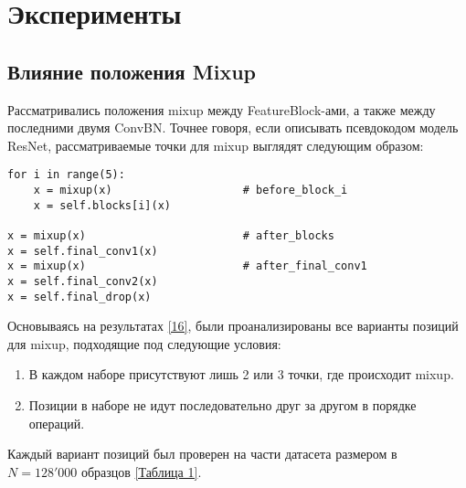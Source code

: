 \section{Эксперименты}
\label{sec:Chapter4} 

\subsection{Влияние положения Mixup}
Рассматривались положения mixup между FeatureBlock-ами, а также между последними двумя ConvBN. Точнее говоря, если описывать псевдокодом модель ResNet, рассматриваемые точки для mixup выглядят следующим образом:

\begin{lstlisting}
for i in range(5):
    x = mixup(x)                    # before_block_i
    x = self.blocks[i](x)

x = mixup(x)                        # after_blocks
x = self.final_conv1(x)
x = mixup(x)                        # after_final_conv1
x = self.final_conv2(x)
x = self.final_drop(x)
\end{lstlisting}

Основываясь на результатах \hyperlink{cite.Bas19}{[16]}, были проанализированы все варианты позиций для mixup, подходящие под следующие условия:
\begin{enumerate}
\item В каждом наборе присутствуют лишь 2 или 3 точки, где происходит mixup.
\item Позиции в наборе не идут последовательно друг за другом в порядке операций.
\end{enumerate}

Каждый вариант позиций был проверен на части датасета размером в $N = 128'000$ образцов \hyperref[tab:mixup_position]{[Таблица 1]}.

\newpage
